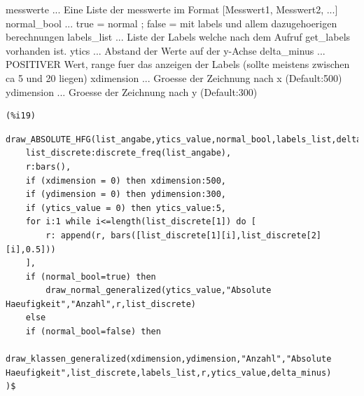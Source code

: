 \documentclass[12pt]{article}
\begin{document}
messwerte       ... Eine Liste der messwerte im Format [Messwert1, Messwert2, ...]
normal\_bool     ... true = normal ; false = mit labels und allem dazugehoerigen berechnungen
labels\_list     ... Liste der Labels welche nach dem Aufruf get\_labels vorhanden ist.
ytics           ... Abstand der Werte auf der y-Achse
delta\_minus     ... POSITIVER Wert, range fuer das anzeigen der Labels (sollte meistens zwischen ca 5 und 20 liegen)
xdimension      ... Groesse der Zeichnung nach x (Default:500)
ydimension      ... Groesse der Zeichnung nach y (Default:300)

\noindent
\begin{minipage}[t]{8ex}{\color{red}\bf
\begin{verbatim}
(%i19) 
\end{verbatim}}
\end{minipage}
\begin{minipage}[t]{\textwidth}{\color{blue}
\begin{verbatim}
draw_ABSOLUTE_HFG(list_angabe,ytics_value,normal_bool,labels_list,delta_minus,xdimension,ydimension):=block(
    list_discrete:discrete_freq(list_angabe),
    r:bars(),
    if (xdimension = 0) then xdimension:500,
    if (ydimension = 0) then ydimension:300,
    if (ytics_value = 0) then ytics_value:5,
    for i:1 while i<=length(list_discrete[1]) do [
        r: append(r, bars([list_discrete[1][i],list_discrete[2][i],0.5]))
    ],
    if (normal_bool=true) then
        draw_normal_generalized(ytics_value,"Absolute Haeufigkeit","Anzahl",r,list_discrete)
    else
    if (normal_bool=false) then
        draw_klassen_generalized(xdimension,ydimension,"Anzahl","Absolute Haeufigkeit",list_discrete,labels_list,r,ytics_value,delta_minus)
)$
\end{verbatim}}
\end{minipage}
\end{document}
